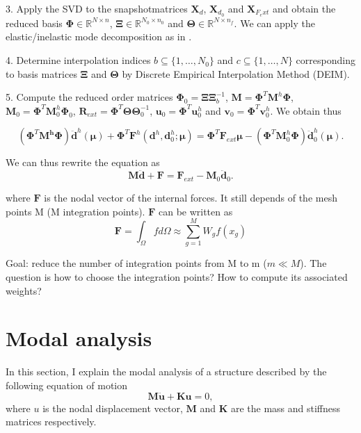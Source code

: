 \documentclass{article}
\begin{document}
3. Apply the SVD to the snapshotmatrices $\bm{X}_d$, $\bm{X}_{d_0}$ and $\bm{X}_{F_ext}$ and obtain the reduced basis $\bm{\Phi} \in \mathbb{R}^{N \times n}$, $\bm{\Xi} \in \mathbb{R}^{N_0 \times n_0}$ and $\bm{\Theta} \in \mathbb{R}^{N \times n_f}$. We can apply the elastic/inelastic mode decomposition as in \cite{hernandez14}.

4. Determine interpolation indices $b \subseteq \{1, \hdots, N_0 \}$ and $c \subseteq \{1, \hdots, N \}$ corresponding to basis matrices $\bm{\Xi}$ and $\bm{\Theta}$ by Discrete Empirical Interpolation Method (DEIM).

5. Compute the reduced order matrices $\bm{\Phi}_0 = \bm{\Xi} \bm{\Xi}_b^{-1}$, $\bm{M} = \bm{\Phi}^T \bm{M}^h\bm{\Phi}$, $\bm{M}_0 = \bm{\Phi}^T \bm{M}_0^h\bm{\Phi}_0$, $\bm{R}_{ext} = \bm{\Phi}^T \bm{\Theta}\bm{\Theta}_0^{-1}$, $\bm{u}_0 = \bm{\Phi}^T \bm{u}_0^h$ and $\bm{v}_0 = \bm{\Phi}^T \bm{v}_0^h$. We obtain thus

\begin{equation}
  (\bm{\Phi}^T \bm{M^h}\bm{\Phi}) \bm{\ddot{d}}^h(\bm{\mu}) + \bm{\Phi}^T \bm{F}^h(\bm{d}^h, \bm{d}_0^h; \bm{\mu}) = \bm{\Phi}^T \bm{F}_{ext} \bm{\mu} - (\bm{\Phi}^T \bm{M}_0^h \bm{\Phi}) \bm{\ddot{d}}_0^h(\bm{\mu}).
\end{equation}

We can thus rewrite the equation as 
\begin{equation}
  \bm{M} \bm{\ddot{d}} + \bm{F} = \bm{F}_{ext} - \bm{M}_0 \bm{\ddot{d}}_0.
\end{equation}

where $\bm{F}$ is the nodal vector of the internal forces. It still depends of the mesh points M (M integration points). $\bm{F}$ can be written as
\begin{equation}
  \bm{F} = \int_\Omega f d\Omega \approx \sum_{g=1}^M W_g f(x_g)
\end{equation}

Goal: reduce the number of integration points from M to m ($m \ll M$). The question is how to choose the integration points? How to compute its associated weights?

\section{Modal analysis}
In this section, I explain the modal analysis of a structure described by the following equation of motion
\begin{equation}
  \bm{M}\bm{\ddot{u}} + \bm{K}\bm{u} = 0,
  \label{eq:modal_analysis_motion_eq}
\end{equation}
where $u$ is the nodal displacement vector, $\bm{M}$ and $\bm{K}$ are the mass and stiffness matrices respectively.
\end{document}
